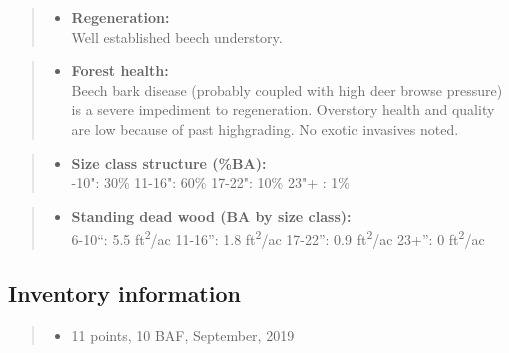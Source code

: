 \documentclass[]{tufte-handout}
\providecommand{\tightlist}{%
  \setlength{\itemsep}{0pt}\setlength{\parskip}{0pt}}
\begin{document}
\begin{quote}
\begin{itemize}
\tightlist
\item
  \textbf{Regeneration:}\\
  \vspace{2pt} Well established beech understory.
\end{itemize}
\end{quote}

\begin{quote}
\begin{itemize}
\tightlist
\item
  \textbf{Forest health:}\\
  \vspace{2pt} Beech bark disease (probably coupled with high deer
  browse pressure) is a severe impediment to regeneration. Overstory
  health and quality are low because of past highgrading. No exotic
  invasives noted.
\end{itemize}
\end{quote}

\begin{quote}
\begin{itemize}
\tightlist
\item
  \textbf{Size class structure (\%BA):}\\
  \vspace{2pt} -10": 30\% \textbar{} 11-16": 60\% \textbar{}
  17-22": 10\% \textbar{} 23"+ : 1\%
\end{itemize}
\end{quote}

\begin{quote}
\begin{itemize}
\tightlist
\item
  \textbf{Standing dead wood (BA by size class):}\\
  \vspace{2pt} \indent \small 6-10``: 5.5 ft\textsuperscript{2}/ac
  \textbar{} 11-16'': 1.8 ft\textsuperscript{2}/ac \textbar{} 17-22'':
  0.9 ft\textsuperscript{2}/ac \textbar{} 23+'': 0
  ft\textsuperscript{2}/ac
\end{itemize}
\end{quote}

\subsection{Inventory information}\label{inventory-information}

\begin{quote}
\begin{itemize}
\tightlist
\item
  11 points, 10 BAF, September, 2019
\end{itemize}
\end{quote}
\end{document}
